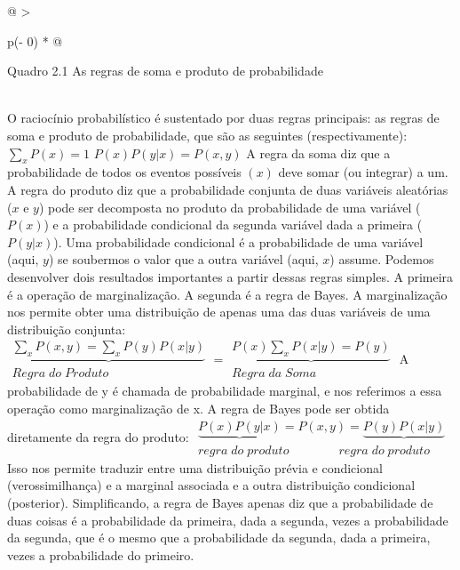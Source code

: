 \documentclass[
  12pt,
]{book}
\begin{document}
\begin{longtable}[]{@{}
  >{\raggedright\arraybackslash}p{(\columnwidth - 0\tabcolsep) * }@{}}
\toprule
\begin{minipage}[b]{\linewidth}\raggedright
Quadro 2.1 As regras de soma e produto de probabilidade
\end{minipage} \\
\midrule
\endhead
O raciocínio probabilístico é sustentado por duas regras principais: as regras de soma e produto de probabilidade, que são as seguintes (respectivamente):\(\sum_{x} P(x)=1\) \(P(x)P(y|x)=P(x,y)\) A regra da soma diz que a probabilidade de todos os eventos possíveis \((x)\) deve somar (ou integrar) a um. A regra do produto diz que a probabilidade conjunta de duas variáveis aleatórias (\(x\) e \(y\)) pode ser decomposta no produto da probabilidade de uma variável (\(P(x)\)) e a probabilidade condicional da segunda variável dada a primeira (\(P(y|x)\)). Uma probabilidade condicional é a probabilidade de uma variável (aqui, \(y\)) se soubermos o valor que a outra variável (aqui, \(x\)) assume. Podemos desenvolver dois resultados importantes a partir dessas regras simples. A primeira é a operação de marginalização. A segunda é a regra de Bayes. A marginalização nos permite obter uma distribuição de apenas uma das duas variáveis de uma distribuição conjunta:\(\begin{matrix} \underbrace{\sum_{x}{P(x,y)}=\sum_{x}{P(y)P(x|y)}} \\ Regra\; do\; Produto \end{matrix}=\begin{matrix} \underbrace{P(x)\sum_{x}{P(x|y)}=P(y)} \\ Regra\; da\; Soma \end{matrix}\) A probabilidade de y é chamada de probabilidade marginal, e nos referimos a essa operação como marginalização de x. A regra de Bayes pode ser obtida diretamente da regra do produto: \(\begin{matrix} \underbrace{P(x)P(y|x)}=P(x,y)=\underbrace{P(y)P(x|y)}\\regra\;do\;produto\qquad \qquad regra\;do\;produto\end{matrix}\) Isso nos permite traduzir entre uma distribuição prévia e condicional (verossimilhança) e a marginal associada e a outra distribuição condicional (posterior). Simplificando, a regra de Bayes apenas diz que a probabilidade de duas coisas é a probabilidade da primeira, dada a segunda, vezes a probabilidade da segunda, que é o mesmo que a probabilidade da segunda, dada a primeira, vezes a probabilidade do primeiro. \\
\bottomrule
\end{longtable}
\end{document}
